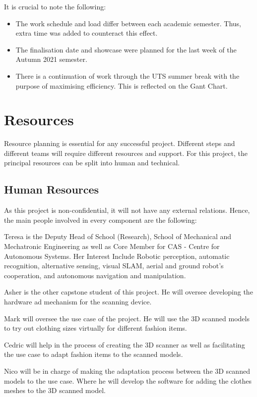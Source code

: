 \documentclass[12pt]{report}
\begin{document}
It is crucial to note the following:
\begin{itemize}
  \item The work schedule and load differ between each academic semester. Thus, extra time was added to counteract this effect.
  \item The finalisation date and showcase were planned for the last week of the Autumn 2021 semester. 
  \item There is a continuation of work through the UTS summer break with the purpose of maximising efficiency. This is reflected on the Gant Chart.
\end{itemize}

\section{Resources}
Resource planning is essential for any successful project. 
Different steps and different teams will require different resources and support. For this project, the principal resources can be split into human and technical. 

\subsection{Human Resources}
As this project is non-confidential, it will not have any external relations. Hence, the main people involved in every component are the following:
\begin{description}[style=nextline]
  \item[Academic Supervisor – Dr Teresa Vidal Calleja] Teresa is the Deputy Head of School (Research), School of Mechanical and Mechatronic Engineering as well as Core Member for CAS - Centre for Autonomous Systems. Her Interest Include Robotic perception, automatic recognition, alternative sensing, visual SLAM, aerial and ground robot’s cooperation, and autonomous navigation and manipulation.
  \item[Hardware Component lead – Asher Katz] Asher is the other capstone student of this project. He will oversee developing the hardware ad mechanism for the scanning device.
  \item[Use cases Component Lead – Mark Liu] Mark will oversee the use case of the project. He will use the 3D scanned models to try out clothing sizes virtually for different fashion items.
  \item[Cedric Le Gentil] Cedric will help in the process of creating the 3D scanner as well as facilitating the use case to adapt fashion items to the scanned models.
  \item[Nico Pietroni] Nico will be in charge of making the adaptation process between the 3D scanned models to the use case. Where he will develop the software for adding the clothes meshes to the 3D scanned model.
\end{description}
\end{document}
